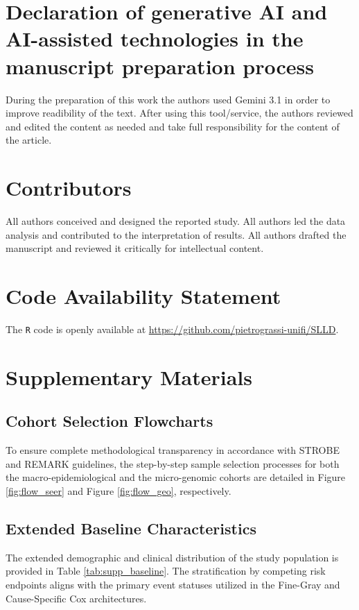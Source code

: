 \documentclass[a4paper,11pt,twocolumn]{article}
\begin{document}
	\appendix
	
	\section*{Declaration of generative AI and AI-assisted technologies in the manuscript preparation process}
	During the preparation of this work the authors used Gemini 3.1 in order to improve readibility of the text. After using this tool/service, the authors reviewed and edited the content as needed and take full responsibility for the content of the article.
	
	\section*{Contributors}
	All authors conceived and designed the reported study. All authors led the data analysis and contributed to the interpretation of results. All authors drafted the manuscript and reviewed it critically for intellectual content.
	
	
	
	
	\section*{Code Availability Statement}
	The \texttt{R} code is openly available at \url{https://github.com/pietrograssi-unifi/SLLD}.
	
	\newpage
	
	\setcounter{table}{0}
	\setcounter{figure}{0}
	\renewcommand{\thetable}{A\arabic{table}}
	\renewcommand{\thefigure}{A\arabic{figure}}
	
	\section{Supplementary Materials}
	\label{app:materials}
	
	\subsection{Cohort Selection Flowcharts}
	
	To ensure complete methodological transparency in accordance with STROBE and REMARK guidelines, the step-by-step sample selection processes for both the macro-epidemiological and the micro-genomic cohorts are detailed in Figure \ref{fig:flow_seer} and Figure \ref{fig:flow_geo}, respectively.
	
	\subsection{Extended Baseline Characteristics}
	The extended demographic and clinical distribution of the study population is provided in Table \ref{tab:supp_baseline}. The stratification by competing risk endpoints aligns with the primary event statuses utilized in the Fine-Gray and Cause-Specific Cox architectures.
	
\end{document}
